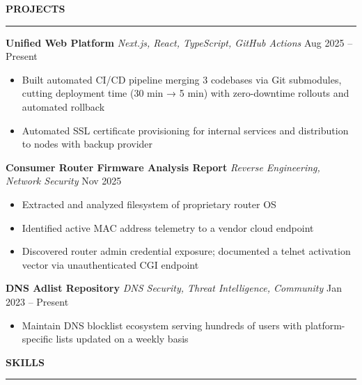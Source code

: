 \documentclass[10.5pt,a4paper]{article}
\begin{document}
\vspace{10pt}

\noindent\textbf{\large PROJECTS}\\[-6pt]
\noindent\rule{\textwidth}{0.5pt}

\vspace{5pt}
\noindent\textbf{Unified Web Platform} \textbar{} \textit{\small Next.js, React, TypeScript, GitHub Actions} \hfill {\small Aug 2025 -- Present}
\begin{itemize}\small
  \item Built automated CI/CD pipeline merging 3 codebases via Git submodules, cutting deployment time (30 min → 5 min) with zero-downtime rollouts and automated rollback
  \item Automated SSL certificate provisioning for internal services and distribution to nodes with backup provider
\end{itemize}

\vspace{2pt}
\noindent\textbf{Consumer Router Firmware Analysis Report} \textbar{} \textit{\small Reverse Engineering, Network Security} \hfill {\small Nov 2025}
\begin{itemize}\small
  \item Extracted and analyzed filesystem of proprietary router OS
  \item Identified active MAC address telemetry to a vendor cloud endpoint
  \item Discovered router admin credential exposure; documented a telnet activation vector via unauthenticated CGI endpoint
\end{itemize}

\vspace{2pt}
\noindent\textbf{DNS Adlist Repository} \textbar{} \textit{\small DNS Security, Threat Intelligence, Community} \hfill {\small Jan 2023 -- Present}
\begin{itemize}\small
  \item Maintain DNS blocklist ecosystem serving hundreds of users with platform-specific lists updated on a weekly basis
\end{itemize}

\vspace{10pt}

\noindent\textbf{\large SKILLS}\\[-6pt]
\noindent\rule{\textwidth}{0.5pt}
\end{document}
